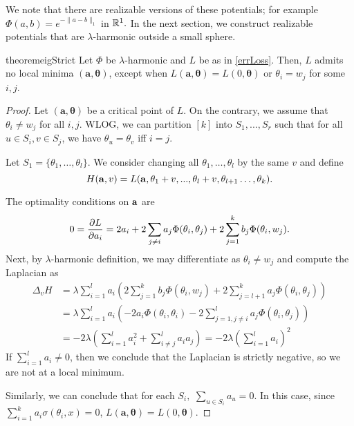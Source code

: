 We note that there are realizable versions of these potentials; for
example $\Phi(a,b) = e^{-\|a-b\|_1}$ in ${\mathbb{R}}^1.$
In the next section, we construct  realizable potentials that are 
$\lambda$-harmonic outside a small sphere. 
%
\begin{restatable}{theorem}{eigStrict}
\label{EigStrict}
Let $\Phi$ be $\lambda$-harmonic and $L$ be as in \eqref{errLoss}. Then,
$L$ admits no local minima $\boldsymbol{(a,\theta)}$, except when
$L(\boldsymbol{a,\theta}) = L(0,\boldsymbol{\theta})$ or $\theta_i = w_j$ for some $i,j$. 
\end{restatable}
\begin{proof}
  Let $(\boldsymbol{a,\theta})$ be a critical point of $L.$ On the
  contrary, we assume that $\theta_i \neq w_j$ for all $i,j.$ WLOG, we
  can partition $[k]$ into $S_1,...,S_r$ such that for all $u \in S_i,
  v \in S_j$, we have $\theta_{u} = \theta_v$ iff $i=j$. 

Let $S_1 = \{ \theta_1, \ldots, \theta_{l}\}.$ 
We consider changing all
$\theta_1, \ldots, \theta_{l}$ by the same $v$ and define 
%
\[H({\bf a}, v) = L({\bf a},\theta_1+v,...,\theta_l+v, \theta_{l+1}
\ldots, \theta_k).\]

The optimality conditions on ${\bf a}$ are 
\begin{align*}
0 = \frac{\partial L}{\partial a_i} = 2a_i  + 2\sum_{j\neq i} a_j \Phi(\theta_i,\theta_j)
  + 2\sum_{j=1}^k b_j \Phi(\theta_i,w_j).
\end{align*}
%
Next, by $\lambda$-harmonic definition, we may differentiate as $\theta_i \neq w_j$ and compute the Laplacian as 
\begin{align*}
\Delta_v H & = \lambda\sum_{i=1}^l a_i \left(2\sum_{j=1}^k b_j
  \Phi(\theta_i, w_j) + 2\sum_{j=l+1}^k a_j
  \Phi(\theta_i, \theta_j)\right) \\
& = \lambda\sum_{i=1}^l a_i \left(-2a_i\Phi(\theta_i, \theta_i) - 2
  \sum_{j = 1, j\neq i}^l  a_j \Phi(\theta_i,\theta_j)\right) \\
%
%
& = -2\lambda\left(\sum_{i=1}^l a_i^2
  +\sum_{i \neq j}^l a_i a_j \right) = -2 \lambda\left(\sum_{i=1}^l a_i\right)^2
\end{align*} 
%
If $\sum_{i=1}^l a_i \neq 0$, then we conclude that the Laplacian is
strictly negative, so we are not at a local minimum. 

Similarly, we can conclude that for each $S_i,$ 
 $\sum_{u \in S_i} a_u = 0$. In this case, since $\sum_{i=1}^k a_i \sigma(\theta_i,x) = 0$, $L(\boldsymbol{a,\theta}) = L(0,\boldsymbol{\theta})$. 
\end{proof} 
